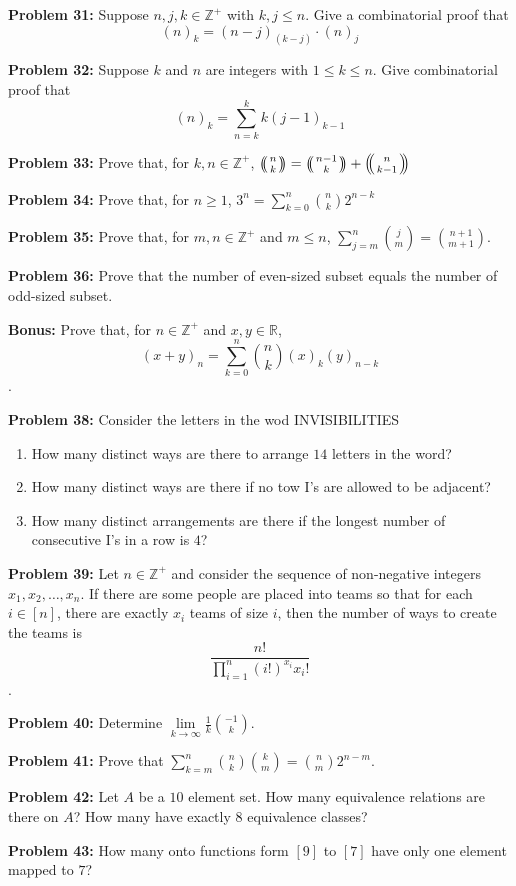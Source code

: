 \documentclass[12pt]{article}
\newcommand{\Z}{\mathbb{Z}}
\newcommand{\R}{\mathbb{R}}
\newcommand{\prob}[1]{\textbf{Problem #1:}}
\def\multiset#1#2{\ensuremath{\left(\kern-.3em\left(\genfrac{}{}{0pt}{}{#1}{#2}\right)\kern-.3em\right)}}
\begin{document}
\prob{31} Suppose $n, j, k \in \mathbb{Z}^+$ with $k,j \le n$. Give a combinatorial proof that $$(n)_k = (n-j)_{(k-j)} \cdot (n)_j$$

\prob{32} Suppose $k$ and $n$ are integers with $1 \le k \le n$. Give combinatorial proof that $$ (n)_k = \sum\limits^k_{n=k} k(j-1)_{k-1}$$

\prob{33} Prove that, for $k,n\in \mathbb{Z}^+$, $\multiset{n}{k} = \multiset{n-1}{k} + \multiset{n}{k-1}$

\prob{34} Prove that, for $n \geq 1$, $3^n = \sum\limits^{n}_{k=0} \binom{n}{k} 2^{n-k}$

\prob{35} Prove that, for $m, n \in \mathbb{Z}^+$ and $m \le n$, $\sum\limits_{j=m}^n \binom{j}{m} = \binom{n+1}{m+1}$.

\prob{36} Prove that the number of even-sized subset equals the number of odd-sized subset.


\textbf{Bonus:} Prove that, for $n \in \mathbb{Z}^+$ and $x,y \in \R$, $$(x+y)_n = \sum\limits^n_{k=0} \binom{n}{k} (x)_k (y)_{n-k}$$.

\prob{38} Consider the letters in the wod INVISIBILITIES

\begin{enumerate}[label=(\alph*)]
    \item How many distinct ways are there to arrange $14$ letters in the word?
    \item How many distinct ways are there if no tow I's are allowed to be adjacent?
    \item How many distinct arrangements are there if the longest number of consecutive I's in a row is $4$?
\end{enumerate}

\prob{39} Let $n \in \Z^+$ and consider the sequence of non-negative integers $x_1, x_2, \dots, x_n$. If there are some people are placed into teams so that for each $i \in [n]$, there are exactly $x_i$ teams of size $i$, then the number of ways to create the teams is $$\frac{n!}{\prod\limits^n_{i=1} (i!)^{x_i} x_i!}$$.

\prob{40} Determine $\lim\limits_{k \to \infty} \frac{1}{k} \binom{-1}{k}$.

\prob{41} Prove that $\sum\limits^n_{k=m} \binom{n}{k} \binom{k}{m} = \binom{n}{m} 2^{n-m}$.

\prob{42} Let $A$ be a $10$ element set. How many equivalence relations are there on $A$? How many have exactly $8$ equivalence classes?

\prob{43} How many onto functions form $[9]$ to $[7]$ have only one element mapped to $7$?
\end{document}

